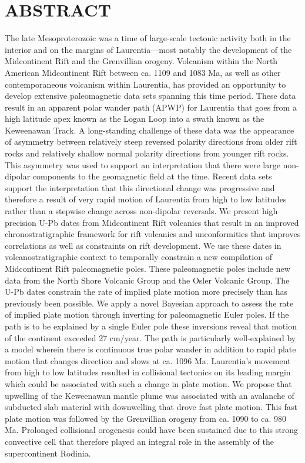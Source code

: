 \documentclass[11pt,letterpaper]{article}
\begin{document}
\section*{ABSTRACT}
The late Mesoproterozoic was a time of large-scale tectonic activity both in the interior and on the margins of Laurentia---most notably the development of the Midcontinent Rift and the Grenvillian orogeny. Volcanism within the North American Midcontinent Rift between ca. 1109 and 1083 Ma, as well as other contemporaneous volcanism within Laurentia, has provided an opportunity to develop extensive paleomagnetic data sets spanning this time period. These data result in an apparent polar wander path (APWP) for Laurentia that goes from a high latitude apex known as the Logan Loop into a swath known as the Keweenawan Track. A long-standing challenge of these data was the appearance of asymmetry between relatively steep reversed polarity directions from older rift rocks and relatively shallow normal polarity directions from younger rift rocks. This asymmetry was used to support an interpretation that there were large non-dipolar components to the geomagnetic field at the time. Recent data sets support the interpretation that this directional change was progressive and therefore a result of very rapid motion of Laurentia from high to low latitudes rather than a stepwise change across non-dipolar reversals. We present high precision U-Pb dates from Midcontinent Rift volcanics that result in an improved chronostratigraphic framework for rift volcanics and unconformities that improves correlations as well as constraints on rift development. We use these dates in volcanostratigraphic context to temporally constrain a new compilation of Midcontinent Rift paleomagnetic poles. These paleomagnetic poles include new data from the North Shore Volcanic Group and the Osler Volcanic Group. The  U-Pb dates constrain the rate of implied plate motion more precisely than has previously been possible. We apply a novel Bayesian approach to assess the rate of implied plate motion through inverting for paleomagnetic Euler poles. If the path is to be explained by a single Euler pole these inversions reveal that motion of the continent exceeded 27 cm/year. The path is particularly well-explained by a model wherein there is continuous true polar wander in addition to rapid plate motion that changes direction and slows at ca. 1096 Ma. Laurentia's movement from high to low latitudes resulted in collisional tectonics on its leading margin which could be associated with such a change in plate motion. We propose that upwelling of the Keweenawan mantle plume was associated with an avalanche of subducted slab material with downwelling that drove fast plate motion. This fast plate motion was followed by the Grenvillian orogeny from ca. 1090 to ca. 980 Ma. Prolonged collisional orogenesis could have been sustained due to this strong convective cell that therefore played an integral role in the assembly of the supercontinent Rodinia.
\end{document}
